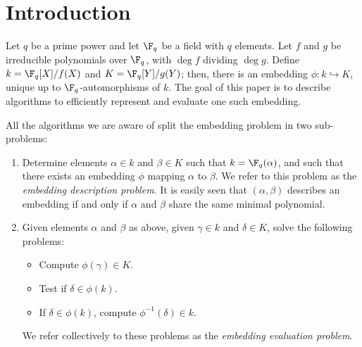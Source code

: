\section{Introduction}
\label{sec:introduction}

Let $q$ be a prime power and let $\F_q$ be a field with $q$
elements. Let $f$ and $g$ be irreducible polynomials over $\F_q$, with
$\deg f$ dividing $\deg g$. Define $k=\F_q[X]/f(X)$ and
$K=\F_q[Y]/g(Y)$; then, there is an embedding $\phi:k\hookrightarrow
K$, unique up to $\F_q$-automorphisms of $k$. The goal of this paper
is to describe algorithms to efficiently represent and evaluate one
such embedding.

All the algorithms we are aware of split the embedding problem in two
sub-problems:
\begin{enumerate}
\item Determine elements $\alpha\in k$ and $\beta\in K$ such that
  $k=\F_q(\alpha)$, and such that there exists an
  embedding $\phi$ mapping $\alpha$ to $\beta$. We refer to this
  problem as the \emph{embedding description problem}.
  It is easily seen that $(\alpha,\beta)$ describes an embedding
  if and only if $\alpha$ and $\beta$ share the same minimal polynomial.
\item Given elements $\alpha$ and $\beta$ as above, given $\gamma\in
  k$ and $\delta\in K$, solve the following problems:
  \begin{itemize}
  \item Compute $\phi(\gamma)\in K$.
  \item Test if $\delta\in\phi(k)$.
  \item If $\delta\in\phi(k)$, compute $\phi^{-1}(\delta)\in k$.
  \end{itemize}
  We refer collectively to these problems as the \emph{embedding
    evaluation problem}.
\end{enumerate}


